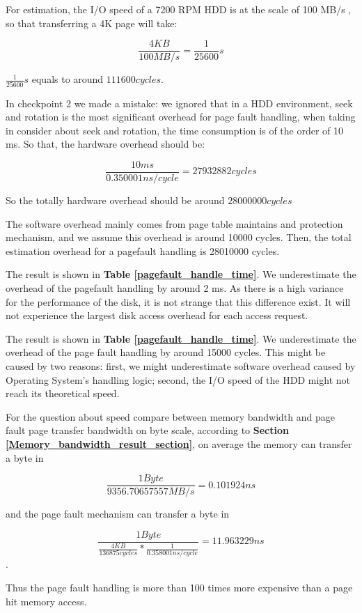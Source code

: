 For estimation, the I/O speed of a 7200 RPM HDD is at the scale of 100 MB/s \cite{wiki:hdd}, so that transferring a 4K page will take:

$$ \frac{4KB}{100 MB/s} = \frac{1}{25600} s $$

$\frac{1}{25600} s$ equals to around $111600 cycles$.

In checkpoint 2 we made a mistake: we ignored that in a HDD environment, seek and rotation is the most significant overhead for page fault handling, when taking in consider about seek and rotation, the time consumption is of the order of 10 ms. So that, the hardware overhead should be:

$$\frac{10 ms}{0.350001 ns/cycle} = 27932882 cycles$$

So the totally hardware overhead should be around $28000000 cycles$

The software overhead mainly comes from page table maintains and protection mechanism, and we assume this overhead is around 10000 cycles. Then, the total estimation overhead for a pagefault handling is 28010000 cycles.

The result is shown in \textbf{Table \ref{pagefault_handle_time}}. We underestimate the overhead of the pagefault handling by around 2 ms. As there is a high variance for the performance of the disk, it is not strange that this difference exist. It will not experience the largest disk access overhead for each access request.

The result is shown in \textbf{Table \ref{pagefault_handle_time}}. We underestimate the overhead of the page fault handling by around 15000 cycles. This might be caused by two reasons: first, we might underestimate software overhead caused by Operating System's handling logic; second, the I/O speed of the HDD might not reach its theoretical speed.

For the question about speed compare between memory bandwidth and page fault page transfer bandwidth on byte scale, according to \textbf{Section \ref{Memory_bandwidth_result_section}}, on average the memory can transfer a byte in

$$\frac{1 Byte}{9356.70657557 MB/s} = 0.101924 ns $$

and the page fault mechanism can transfer a byte in

$$\frac{1 Byte}{\frac{4 KB}{136875 cycles} * \frac{1}{0.358001 ns/cycle}} = 11.963229 ns $$.

Thus the page fault handling is more than 100 times more expensive than a page hit memory access.

